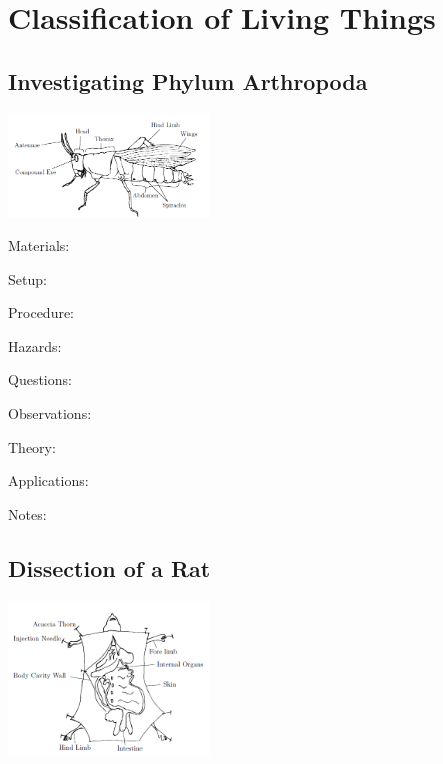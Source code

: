 \section{Classification of Living Things}

\begin{multicols}{2}




\subsection{Investigating Phylum Arthropoda} %

\begin{center}
\includegraphics[width=0.4\textwidth]{./img/arthropoda.png}
\end{center}

\begin{description*}
\item[Materials:]{}
\item[Setup:]{}
\item[Procedure:]{}
\item[Hazards:]{}
\item[Questions:]{}
\item[Observations:]{}
\item[Theory:]{}
\item[Applications:]{}
\item[Notes:]{}
\end{description*}

\subsection{Dissection of a Rat} %

\begin{center}
\includegraphics[width=0.4\textwidth]{./img/dissection-rat.png}
\end{center}


\end{multicols}
